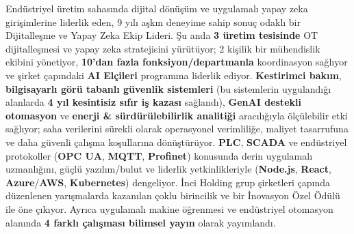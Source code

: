 \vspace{0mm}


\begin{cvparagraph}

Endüstriyel üretim sahasında dijital dönüşüm ve uygulamalı yapay zeka girişimlerine liderlik eden, 9 yılı aşkın deneyime sahip sonuç odaklı bir Dijitalleşme ve Yapay Zeka Ekip Lideri. Şu anda \textbf{3 üretim tesisinde} OT dijitalleşmesi ve yapay zeka stratejisini yürütüyor; 2 kişilik bir mühendislik ekibini yönetiyor, \textbf{10'dan fazla fonksiyon/departmanla} koordinasyon sağlıyor ve şirket çapındaki \textbf{AI Elçileri} programına liderlik ediyor. \textbf{Kestirimci bakım}, \textbf{bilgisayarlı görü tabanlı güvenlik sistemleri} (bu sistemlerin uygulandığı alanlarda \textbf{4 yıl kesintisiz sıfır iş kazası} sağlandı), \textbf{GenAI destekli otomasyon} ve \textbf{enerji \& sürdürülebilirlik analitiği} aracılığıyla ölçülebilir etki sağlıyor; saha verilerini sürekli olarak operasyonel verimliliğe, maliyet tasarrufuna ve daha güvenli çalışma koşullarına dönüştürüyor. \textbf{PLC}, \textbf{SCADA} ve endüstriyel protokoller (\textbf{OPC UA}, \textbf{MQTT}, \textbf{Profinet}) konusunda derin uygulamalı uzmanlığını, güçlü yazılım/bulut ve liderlik yetkinlikleriyle (\textbf{Node.js}, \textbf{React}, \textbf{Azure}/\textbf{AWS}, \textbf{Kubernetes}) dengeliyor. İnci Holding grup şirketleri çapında düzenlenen yarışmalarda kazanılan çoklu birincilik ve bir İnovasyon Özel Ödülü ile öne çıkıyor. Ayrıca uygulamalı makine öğrenmesi ve endüstriyel otomasyon alanında \textbf{4 farklı çalışması bilimsel yayın} olarak yayımlandı.
\end{cvparagraph}
